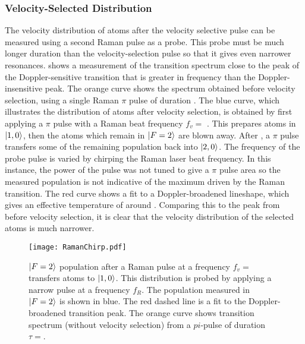 \subsubsection{Velocity-Selected Distribution}
The velocity distribution of atoms after the velocity selective pulse
can be measured using a second Raman pulse as a probe. This probe must
be much longer duration than
the velocity-selection pulse so that it gives even narrower
resonances. 
 shows a measurement of the transition
spectrum close to the peak of the Doppler-sensitive transition that is
greater in frequency than the Doppler-insensitive peak. The orange
curve shows the spectrum obtained before velocity selection, using a
single Raman $\pi$ pulse of
duration . The blue curve, which illustrates the
distribution of atoms after velocity selection, is obtained by first
applying a
 \(\pi\) pulse with a Raman beat frequency
\(f_v = \) . This prepares atoms in
\(\ket{1,0}\), then the atoms which remain in
\(\ket{F=2}\) are blown away. After , a
 \(\pi\) pulse transfers some of the
remaining population back into \(\ket{2,0}\). The frequency of the
probe pulse is varied by chirping the Raman laser beat frequency. In
this instance, the power of the  pulse was not tuned to give a \(\pi\)
pulse area so the measured population is not indicative of the maximum
driven by the Raman transition. The red curve shows a fit to a
Doppler-broadened lineshape, which gives an effective temperature
of around . Comparing this to the peak from
before velocity selection, it is clear that the velocity
distribution of the selected atoms is much narrower. 
\begin{figure}[htpb!]
  \centering
  \texttt{[image: RamanChirp.pdf]}
  \caption[$\ket{F=2}$ population after a velocity-selective Raman
  $\pi$ pulse.]{\(\ket{F=2}\) population after a Raman pulse at a frequency
    \(f_v =\) transfers atoms to
    \(\ket{1,0}\). This distribution is probed by
  applying a narrow pulse at a frequency \(f_{R}\). The population
measured in \(\ket{F=2}\) is shown in blue. The red dashed line is a
fit to the Doppler-broadened
transition peak. The orange curve shows
transition spectrum (without velocity selection) from a $pi$-pulse
of duration \(\tau = \).}
  \label{fig:vel_select_chirp}
\end{figure}
